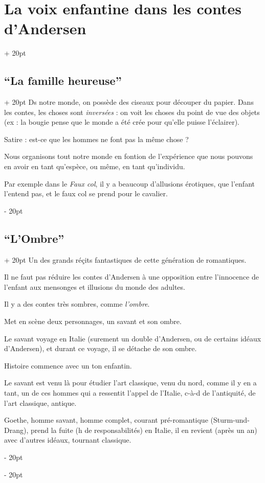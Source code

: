 \documentclass[a4paper, 12pt, twoside]{article}
\newcommand{\ind}[1][20pt]{\advance\leftskip + #1}
\newcommand{\deind}[1][20pt]{\advance\leftskip - #1}
\newenvironment{indt}[2][20pt]{#2 \par \ind[#1]}{\par \deind} %
\begin{document}
\begin{indt}{\section{La voix enfantine dans les contes d'Andersen}}
\begin{indt}{\subsection{``La famille heureuse''}}
            Ds notre monde, on possède des ciseaux pour découper du papier. Dans les contes, les choses sont \textit{inversées} : on voit les choses du point de vue des objets (ex : la bougie pense que le monde a été crée pour qu'elle puisse l'éclairer).
            
            Satire : est-ce que les hommes ne font pas la même chose ?
            
            Nous organisons tout notre monde en fontion de l'expérience que nous pouvons en avoir en tant qu'espèce, ou même, en tant qu'individu.
            
            Par exemple dans le \textit{Faux col}, il y a beaucoup d'allusions érotiques, que l'enfant l'entend pas, et le faux col se prend pour le cavalier.
        \end{indt}
        
        \vspace{12pt}
        
        \begin{indt}{\subsection{``L'Ombre''}}
            Un des grands réçits fantastiques de cette génération de romantiques.
            
            \vspace{12pt}
            
            Il ne faut pas réduire les contes d'Andersen à une opposition entre l'innocence de l'enfant aux mensonges et illusions du monde des adultes.
            
            Il y a des contes très sombres, comme \textit{l'ombre}.
            
            Met en scène deux personnages, un savant et son ombre.
            
            Le savant voyage en Italie (surement un double d'Andersen, ou de certains idéaux d'Andersen), et durant ce voyage, il se détache de son ombre.
            
            Histoire commence avec un ton enfantin.
            
            Le savant est venu là pour étudier l'art classique, venu du nord, comme il y en a tant, un de ces hommes qui a ressentit l'appel de l'Italie, c-à-d de l'antiquité, de l'art classique, antique.
            
            Goethe, homme savant, homme complet, courant pré-romantique (Sturm-und-Drang), prend la fuite (h de responsabilités) en Italie, il en revient (après un an) avec d'autres idéaux, tournant classique.
            

\end{indt}
\end{indt}
\end{document}
